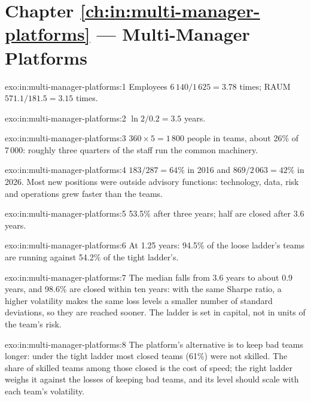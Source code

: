\section*{Chapter \ref{ch:in:multi-manager-platforms} --- Multi-Manager Platforms}

\begin{solution}{exo:in:multi-manager-platforms:1}
Employees $6\,140/1\,625=3.78$ times; RAUM $571.1/181.5=3.15$ times.
\end{solution}

\begin{solution}{exo:in:multi-manager-platforms:2}
$\ln2/0.2=3.5$ years.
\end{solution}

\begin{solution}{exo:in:multi-manager-platforms:3}
$360\times5=1\,800$ people in teams, about 26\% of 7\,000: roughly three quarters of the staff run the common machinery.
\end{solution}

\begin{solution}{exo:in:multi-manager-platforms:4}
$183/287=64\%$ in 2016 and $869/2\,063=42\%$ in 2026. Most new positions were outside advisory functions: technology,
data, risk and operations grew faster than the teams.
\end{solution}

\begin{solution}{exo:in:multi-manager-platforms:5}
53.5\% after three years; half are closed after 3.6 years.
\end{solution}

\begin{solution}{exo:in:multi-manager-platforms:6}
At 1.25 years: 94.5\% of the loose ladder's teams are running against 54.2\% of the tight ladder's.
\end{solution}

\begin{solution}{exo:in:multi-manager-platforms:7}
The median falls from 3.6 years to about 0.9 years, and 98.6\% are closed within ten years: with the same Sharpe ratio,
a higher volatility makes the same loss levels a smaller number of standard deviations, so they are reached sooner.
The ladder is set in capital, not in units of the team's risk.
\end{solution}

\begin{solution}{exo:in:multi-manager-platforms:8}
The platform's alternative is to keep bad teams longer: under the tight ladder most closed teams (61\%) were not
skilled. The share of skilled teams among those closed is the cost of speed; the right ladder weighs it against the losses of
keeping bad teams, and its level should scale with each team's volatility.
\end{solution}

